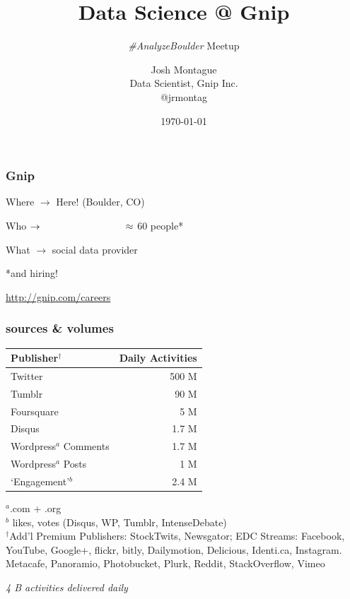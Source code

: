 \documentclass{beamer}
\title{Data Science @ Gnip }
\subtitle{\emph{\#AnalyzeBoulder} Meetup}
\author{Josh Montague\texorpdfstring{\\ Data Scientist, Gnip Inc. \\ @jrmontag}{}}
\date{\today}
\begin{document}
\begin{frame}
\titlepage
\end{frame}


\begin{frame} \frametitle{Gnip}

\vspace{0.2in}

\LARGE{Where $\to$  \hspace{0.55in} Here! (Boulder, CO) }

\vspace{0.2in}

\LARGE{Who $\to  \hspace{1.2in} \approx$ 60 people* } 

\vspace{0.2in}

\LARGE{What $\to$ \hspace{0.7in} social data provider}

\vspace{0.7in}

{\hfill \Large{*and hiring!}} 

{\hfill \normalsize\url{http://gnip.com/careers}}
\end{frame}


\begin{frame} \frametitle{sources \& volumes}

\vspace{0.1in}

\begin{table}
	\begin{tabular}{l|r}
		\hline
		{Publisher$^\dagger$}			&   	{Daily Activities} \\
		\hline 
		Twitter      					&	500 M \\
		Tumblr      					&	90 M \\
		Foursquare      					&	5 M \\
		Disqus       					&	1.7 M \\
		Wordpress$^{a}$ Comments 		&	1.7 M \\
		Wordpress$^{a}$ Posts 			&	1 M \\
		`Engagement'$^{b}$ 			&	2.4 M \\
		\hline
	\end{tabular}
\end{table}
$^a$.com + .org \\
$^b$ likes, votes (Disqus, WP, Tumblr, IntenseDebate) \\

{\tiny
$^\dagger$Add'l Premium Publishers: StockTwits, Newsgator; EDC Streams: Facebook, YouTube, Google+, flickr, bitly, Dailymotion, Delicious, Identi.ca, Instagram. Metacafe, Panoramio, Photobucket, Plurk, Reddit, StackOverflow, Vimeo
}

\begin{center}
	\LARGE{\emph{4 B activities delivered daily}}
\end{center}

\end{frame}
\end{document}
